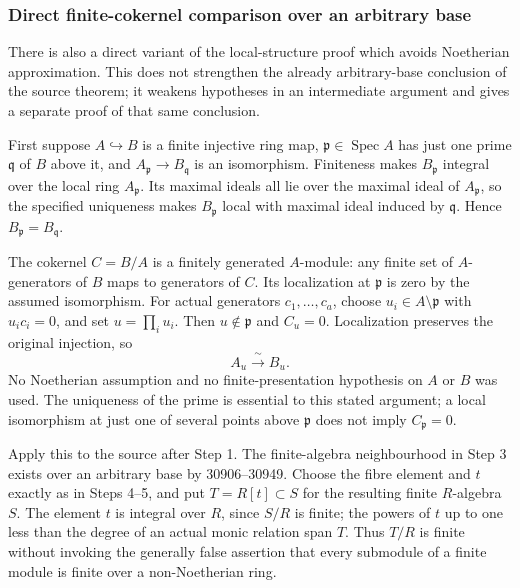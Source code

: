 \subsubsection{Direct finite-cokernel comparison over an arbitrary base}\label{algebra-proof-052-direct-finite-cokernel-comparison-over-an-arbitrary-base}

There is also a direct variant of the local-structure proof which avoids Noetherian approximation. This does not strengthen the already arbitrary-base conclusion of the source theorem; it weakens hypotheses in an intermediate argument and gives a separate proof of that same conclusion.

First suppose \(A\hookrightarrow B\) is a finite injective ring map, \(\mathfrak p\in\operatorname{Spec}A\) has just one prime \(\mathfrak q\) of \(B\) above it, and \(A_{\mathfrak p}\to B_{\mathfrak q}\) is an isomorphism. Finiteness makes \(B_{\mathfrak p}\) integral over the local ring \(A_{\mathfrak p}\). Its maximal ideals all lie over the maximal ideal of \(A_{\mathfrak p}\), so the specified uniqueness makes \(B_{\mathfrak p}\) local with maximal ideal induced by \(\mathfrak q\). Hence \(B_{\mathfrak p}=B_{\mathfrak q}\).

The cokernel \(C=B/A\) is a finitely generated \(A\)-module: any finite set of \(A\)-generators of \(B\) maps to generators of \(C\). Its localization at \(\mathfrak p\) is zero by the assumed isomorphism. For actual generators \(c_1,\ldots,c_a\), choose \(u_i\in A\setminus\mathfrak p\) with \(u_ic_i=0\), and set \(u=\prod_i u_i\). Then \(u\notin\mathfrak p\) and \(C_u=0\). Localization preserves the original injection, so \[
A_u\xrightarrow{\;\sim\;}B_u.
\] No Noetherian assumption and no finite-presentation hypothesis on \(A\) or \(B\) was used. The uniqueness of the prime is essential to this stated argument; a local isomorphism at just one of several points above \(\mathfrak p\) does not imply \(C_{\mathfrak p}=0\).

Apply this to the source after Step 1. The finite-algebra neighbourhood in Step 3 exists over an arbitrary base by 30906--30949. Choose the fibre element and \(t\) exactly as in Steps 4--5, and put \(T=R[t]\subset S\) for the resulting finite \(R\)-algebra \(S\). The element \(t\) is integral over \(R\), since \(S/R\) is finite; the powers of \(t\) up to one less than the degree of an actual monic relation span \(T\). Thus \(T/R\) is finite without invoking the generally false assertion that every submodule of a finite module is finite over a non-Noetherian ring.

